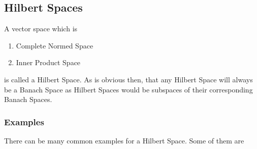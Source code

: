 \documentclass[a4paper,12pt]{article}
\begin{document}
	\subsection{Hilbert Spaces}
	A vector space which is 
		\begin{enumerate}
			\item Complete Normed Space
			\item Inner Product Space
		\end{enumerate}
		is called a Hilbert Space. As is obvious then, that any Hilbert Space will always be a Banach Space as Hilbert Spaces would be subspaces of their corresponding Banach Spaces.
		\subsubsection{Examples} There can be many common examples for a Hilbert Space. Some of them are
\end{document}
